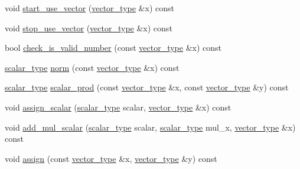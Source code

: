 \begin{DoxyCompactItemize}
\item 
void \hyperlink{structcpu__vector__operations_a36ce15d54cfb2b08aeeb25d7e601e342}{start\-\_\-use\-\_\-vector} (\hyperlink{structcpu__vector__operations_a1962836df596ce262704d208e9a6d8f9}{vector\-\_\-type} \&x) const 
\item 
void \hyperlink{structcpu__vector__operations_ab79fb826fdea7cc2a301e9db9bdc705e}{stop\-\_\-use\-\_\-vector} (\hyperlink{structcpu__vector__operations_a1962836df596ce262704d208e9a6d8f9}{vector\-\_\-type} \&x) const 
\item 
bool \hyperlink{structcpu__vector__operations_a1a662c7c6f4dba1119c5dd63777ef2ab}{check\-\_\-is\-\_\-valid\-\_\-number} (const \hyperlink{structcpu__vector__operations_a1962836df596ce262704d208e9a6d8f9}{vector\-\_\-type} \&x) const 
\item 
\hyperlink{structcpu__vector__operations_aca6b216aa1fb172df83d98350e94fd61}{scalar\-\_\-type} \hyperlink{structcpu__vector__operations_abb4a0ddd5d65ef1ae8c979e71da96ba8}{norm} (const \hyperlink{structcpu__vector__operations_a1962836df596ce262704d208e9a6d8f9}{vector\-\_\-type} \&x) const 
\item 
\hyperlink{structcpu__vector__operations_aca6b216aa1fb172df83d98350e94fd61}{scalar\-\_\-type} \hyperlink{structcpu__vector__operations_a4c4fcf653cf773cb4819add09dbd1e49}{scalar\-\_\-prod} (const \hyperlink{structcpu__vector__operations_a1962836df596ce262704d208e9a6d8f9}{vector\-\_\-type} \&x, const \hyperlink{structcpu__vector__operations_a1962836df596ce262704d208e9a6d8f9}{vector\-\_\-type} \&y) const 
\item 
void \hyperlink{structcpu__vector__operations_a2efc001178974db349c1ecbc6a60a98f}{assign\-\_\-scalar} (\hyperlink{structcpu__vector__operations_aca6b216aa1fb172df83d98350e94fd61}{scalar\-\_\-type} scalar, \hyperlink{structcpu__vector__operations_a1962836df596ce262704d208e9a6d8f9}{vector\-\_\-type} \&x) const 
\item 
void \hyperlink{structcpu__vector__operations_a2a20e02394094c974f96f4e9063fb649}{add\-\_\-mul\-\_\-scalar} (\hyperlink{structcpu__vector__operations_aca6b216aa1fb172df83d98350e94fd61}{scalar\-\_\-type} scalar, \hyperlink{structcpu__vector__operations_aca6b216aa1fb172df83d98350e94fd61}{scalar\-\_\-type} mul\-\_\-x, \hyperlink{structcpu__vector__operations_a1962836df596ce262704d208e9a6d8f9}{vector\-\_\-type} \&x) const 
\item 
void \hyperlink{structcpu__vector__operations_aee016bc7ac6cc3a7149d3444e5b0ac57}{assign} (const \hyperlink{structcpu__vector__operations_a1962836df596ce262704d208e9a6d8f9}{vector\-\_\-type} \&x, \hyperlink{structcpu__vector__operations_a1962836df596ce262704d208e9a6d8f9}{vector\-\_\-type} \&y) const 

\end{DoxyCompactItemize}
